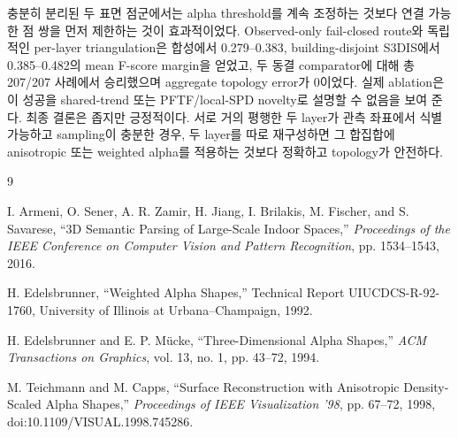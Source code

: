 \documentclass[12pt,a4paper]{article}
\begin{document}
충분히 분리된 두 표면 점군에서는 alpha threshold를 계속 조정하는 것보다
연결 가능한 점 쌍을 먼저 제한하는 것이 효과적이었다. Observed-only
fail-closed route와 독립적인 per-layer triangulation은 합성에서 0.279--0.383,
building-disjoint S3DIS에서 0.385--0.482의 mean F-score margin을 얻었고,
두 동결 comparator에 대해 총 207/207 사례에서 승리했으며 aggregate topology
error가 0이었다. 실제 ablation은 이 성공을 shared-trend 또는 PFTF/local-SPD
novelty로 설명할 수 없음을 보여 준다. 최종 결론은 좁지만 긍정적이다. 서로
거의 평행한 두 layer가 관측 좌표에서 식별 가능하고 sampling이 충분한 경우,
두 layer를 따로 재구성하면 그 합집합에 anisotropic 또는 weighted alpha를
적용하는 것보다 정확하고 topology가 안전하다.

\begin{thebibliography}{9}

I. Armeni, O. Sener, A. R. Zamir, H. Jiang, I. Brilakis, M. Fischer, and
S. Savarese, ``3D Semantic Parsing of Large-Scale Indoor Spaces,''
\emph{Proceedings of the IEEE Conference on Computer Vision and Pattern
Recognition}, pp. 1534--1543, 2016.

H. Edelsbrunner, ``Weighted Alpha Shapes,'' Technical Report
UIUCDCS-R-92-1760, University of Illinois at Urbana--Champaign, 1992.

H. Edelsbrunner and E. P. M\"ucke, ``Three-Dimensional Alpha Shapes,''
\emph{ACM Transactions on Graphics}, vol. 13, no. 1, pp. 43--72, 1994.

M. Teichmann and M. Capps, ``Surface Reconstruction with Anisotropic
Density-Scaled Alpha Shapes,'' \emph{Proceedings of IEEE Visualization '98},
pp. 67--72, 1998, doi:10.1109/VISUAL.1998.745286.

\end{thebibliography}
\end{document}
